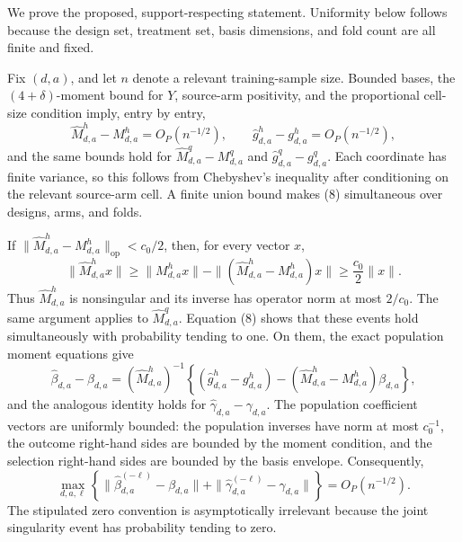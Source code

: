 We prove the proposed, support-respecting statement.  Uniformity below follows because the design set, treatment set, basis dimensions, and fold count are all finite and fixed.

Fix \((d,a)\), and let \(n\) denote a relevant training-sample size.  Bounded bases, the \((4+\delta)\)-moment bound for \(Y\), source-arm positivity, and the proportional cell-size condition imply, entry by entry,
\[
 \widehat M^h_{d,a}-M^h_{d,a}=O_P(n^{-1/2}),
 \qquad
 \widehat g^h_{d,a}-g^h_{d,a}=O_P(n^{-1/2}),                  \tag{8}
\]
and the same bounds hold for \(\widehat M^q_{d,a}-M^q_{d,a}\) and \(\widehat g^q_{d,a}-g^q_{d,a}\).  Each coordinate has finite variance, so this follows from Chebyshev's inequality after conditioning on the relevant source-arm cell.  A finite union bound makes (8) simultaneous over designs, arms, and folds.

If \(\|\widehat M^h_{d,a}-M^h_{d,a}\|_{\mathrm{op}}<c_0/2\), then, for every vector \(x\),
\[
 \|\widehat M^h_{d,a}x\|
 \ge \|M^h_{d,a}x\|
      -\|(\widehat M^h_{d,a}-M^h_{d,a})x\|
 \ge \frac{c_0}{2}\|x\|.
\]
Thus \(\widehat M^h_{d,a}\) is nonsingular and its inverse has operator norm at most \(2/c_0\).  The same argument applies to \(\widehat M^q_{d,a}\).  Equation (8) shows that these events hold simultaneously with probability tending to one.  On them, the exact population moment equations give
\[
 \widehat\beta_{d,a}-\beta_{d,a}
 = (\widehat M^h_{d,a})^{-1}
 \left\{(\widehat g^h_{d,a}-g^h_{d,a})
 -(\widehat M^h_{d,a}-M^h_{d,a})\beta_{d,a}\right\},         \tag{9}
\]
and the analogous identity holds for \(\widehat\gamma_{d,a}-\gamma_{d,a}\).  The population coefficient vectors are uniformly bounded: the population inverses have norm at most \(c_0^{-1}\), the outcome right-hand sides are bounded by the moment condition, and the selection right-hand sides are bounded by the basis envelope.  Consequently,
\[
 \max_{d,a,\ell}\left\{
 \|\widehat\beta_{d,a}^{(-\ell)}-\beta_{d,a}\|
 +\|\widehat\gamma_{d,a}^{(-\ell)}-\gamma_{d,a}\|
 \right\}=O_P(n^{-1/2}).                                     \tag{10}
\]
The stipulated zero convention is asymptotically irrelevant because the joint singularity event has probability tending to zero.

